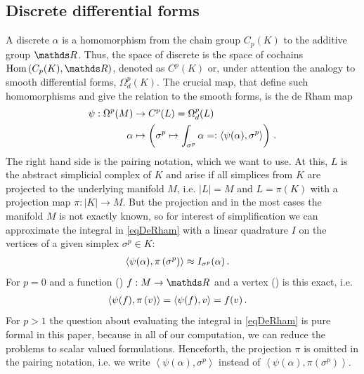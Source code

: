   \subsection{Discrete differential forms}
    A discrete  \( \alpha \) is a homomorphism from the chain group \( C_{p}(K) \) to the additive group \( \R \).
    Thus, the space of discrete  is the space of cochains \( \text{Hom}\left( C_{p}(K), \R \right)\), 
    denoted as \( C^{p}(K) \) or, under attention the analogy to smooth differential forms, \( \Omega^{p}_{d}(K) \).
    The crucial map, that define such homomorphisms and give the relation to the smooth forms,
    is the de Rham map
    \begin{align}
    \label{eqDeRham}
      \begin{aligned}
        \psi: \Omega^{p}(M) &\rightarrow C^{p}(L) = \Omega_{d}^{p}(L)\\
                       \alpha   &\mapsto \left( \sigma^{p} \mapsto \int_{\sigma^{p}} \alpha =: \left\langle \psi(\alpha), \sigma^{p} \right\rangle\right)
                       \,\text{.}
      \end{aligned}
    \end{align}
    The right hand side is the pairing notation, which we want to use.
    At this, \( L \) is the abstract simplicial complex of \( K \) and arise if all simplices from \( K \) are projected to the underlying
    manifold \( M \), i.e. \( |L| = M  \) and \( L=\pi(K) \) with a projection map \( \pi:|K|\rightarrow M \).
    But the projection and in the most cases the manifold \( M \) is not exactly known, 
    so for interest of simplification we can approximate the integral in \eqref{eqDeRham} with a linear quadrature \( I \) on the vertices of a
    given simplex \( \sigma^{p}\in K \):
    \begin{align}
      \left\langle \psi(\alpha), \pi\left(\sigma^{p}\right) \right\rangle &\approx I_{\sigma^{p}}(\alpha) \,\text{.}
    \end{align}
    For \( p=0 \) and a function () \( f:M\rightarrow\R \) and a vertex () is this exact, 
    i.e.
    \begin{align}
      \left\langle \psi(f), \pi\left(v\right) \right\rangle 
            &= \left\langle \psi(f), v \right\rangle = f(v) \,\text{.}
    \end{align}
    For \( p>1 \) the question about evaluating the integral in \eqref{eqDeRham} is pure formal in this paper, 
    because in all of our computation, we can reduce the problems to scalar valued formulations.
    Henceforth, the projection \( \pi \) is omitted in the pairing notation, 
    i.e. we write \( \left\langle \psi(\alpha), \sigma^{p} \right\rangle \) instead of
    \( \left\langle \psi(\alpha), \pi\left(\sigma^{p}\right) \right\rangle \).

